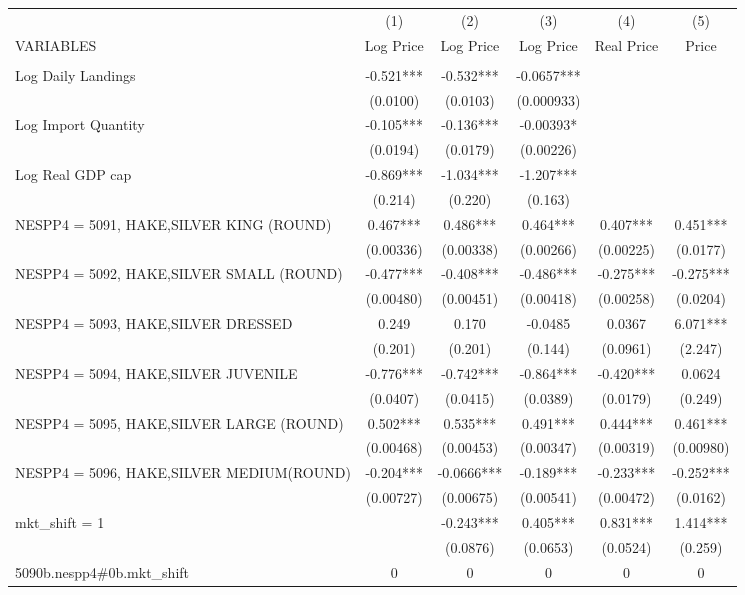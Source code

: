 \begin{tabular}{lccccc} \hline
 & (1) & (2) & (3) & (4) & (5) \\
VARIABLES & Log Price & Log Price & Log Price & Real Price & Price \\ \hline
 &  &  &  &  &  \\
Log Daily Landings & -0.521*** & -0.532*** & -0.0657*** &  &  \\
 & (0.0100) & (0.0103) & (0.000933) &  &  \\
Log Import Quantity & -0.105*** & -0.136*** & -0.00393* &  &  \\
 & (0.0194) & (0.0179) & (0.00226) &  &  \\
Log Real GDP cap & -0.869*** & -1.034*** & -1.207*** &  &  \\
 & (0.214) & (0.220) & (0.163) &  &  \\
NESPP4 = 5091, HAKE,SILVER KING (ROUND) & 0.467*** & 0.486*** & 0.464*** & 0.407*** & 0.451*** \\
 & (0.00336) & (0.00338) & (0.00266) & (0.00225) & (0.0177) \\
NESPP4 = 5092, HAKE,SILVER SMALL (ROUND) & -0.477*** & -0.408*** & -0.486*** & -0.275*** & -0.275*** \\
 & (0.00480) & (0.00451) & (0.00418) & (0.00258) & (0.0204) \\
NESPP4 = 5093, HAKE,SILVER DRESSED & 0.249 & 0.170 & -0.0485 & 0.0367 & 6.071*** \\
 & (0.201) & (0.201) & (0.144) & (0.0961) & (2.247) \\
NESPP4 = 5094, HAKE,SILVER JUVENILE & -0.776*** & -0.742*** & -0.864*** & -0.420*** & 0.0624 \\
 & (0.0407) & (0.0415) & (0.0389) & (0.0179) & (0.249) \\
NESPP4 = 5095, HAKE,SILVER LARGE (ROUND) & 0.502*** & 0.535*** & 0.491*** & 0.444*** & 0.461*** \\
 & (0.00468) & (0.00453) & (0.00347) & (0.00319) & (0.00980) \\
NESPP4 = 5096, HAKE,SILVER MEDIUM(ROUND) & -0.204*** & -0.0666*** & -0.189*** & -0.233*** & -0.252*** \\
 & (0.00727) & (0.00675) & (0.00541) & (0.00472) & (0.0162) \\
mkt\_shift = 1 &  & -0.243*** & 0.405*** & 0.831*** & 1.414*** \\
 &  & (0.0876) & (0.0653) & (0.0524) & (0.259) \\
5090b.nespp4\#0b.mkt\_shift & 0 & 0 & 0 & 0 & 0 \\

\end{tabular}

